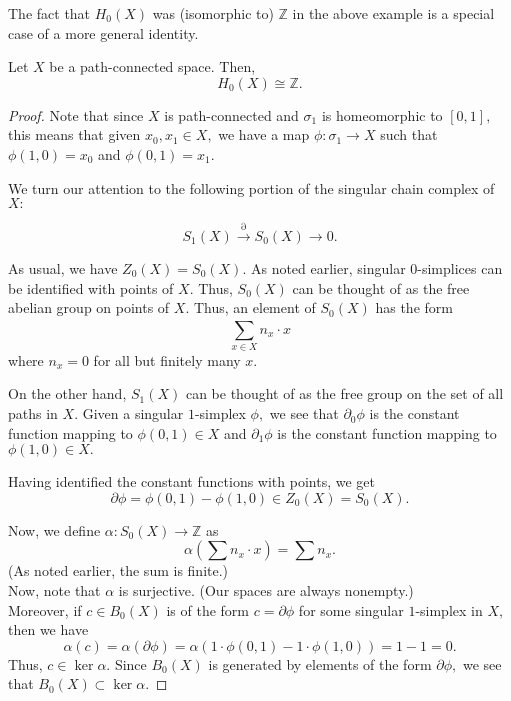 \documentclass[12pt]{article}
\begin{document}
The fact that $H_0(X)$ was (isomorphic to) $\mathbb{Z}$ in the above example is a special case of a more general identity.

\begin{prop} \label{prop:pathconnectedh0isZ}
	Let $X$ be a path-connected space. Then,
	\begin{equation*} 
		H_0(X) \cong \mathbb{Z}.
	\end{equation*}
\end{prop}
\begin{proof} 
	Note that since $X$ is path-connected and $\sigma_1$ is homeomorphic to $[0, 1],$ this means that given $x_0, x_1 \in X,$ we have a map $\phi:\sigma_1\to X$ such that $\phi(1, 0) = x_0$ and $\phi(0, 1) = x_1.$

	We turn our attention to the following portion of the singular chain complex of $X:$

	\begin{equation*} 
		S_1(X) \overset{\partial}{\longrightarrow} S_0(X) \overset{}{\longrightarrow} 0.
	\end{equation*}

	As usual, we have $Z_0(X) = S_0(X).$ As noted earlier, singular $0$-simplices can be identified with points of $X.$ Thus, $S_0(X)$ can be thought of as the free abelian group on points of $X.$ Thus, an element of $S_0(X)$ has the form
	\begin{equation*} 
		\sum_{x \in X}^{}n_x\cdot x
	\end{equation*}
	where $n_x = 0$ for all but finitely many $x.$

	On the other hand, $S_1(X)$ can be thought of as the free group on the set of all paths in $X.$ Given a singular $1$-simplex $\phi,$ we see that $\partial_0\phi$ is the constant function mapping to $\phi(0, 1) \in X$ and $\partial_1\phi$ is the constant function mapping to $\phi(1, 0) \in X.$

	Having identified the constant functions with points, we get
	\begin{equation*} 
		\partial\phi = \phi(0, 1) - \phi(1, 0) \in Z_0(X) = S_0(X).
	\end{equation*}

	Now, we define $\alpha:S_0(X) \to \mathbb{Z}$ as
	\begin{equation*} 
		\alpha\left(\sum n_x\cdot x\right) = \sum n_x.
	\end{equation*}
	(As noted earlier, the sum is finite.)\\
	Now, note that $\alpha$ is surjective. (Our spaces are always nonempty.)\\
	Moreover, if $c \in B_0(X)$ is of the form $c = \partial\phi$ for some singular $1$-simplex in $X,$ then we have
	\begin{equation*} 
		\alpha(c) = \alpha(\partial\phi) = \alpha(1\cdot\phi(0, 1) - 1\cdot\phi(1, 0)) = 1 - 1 = 0.
	\end{equation*}
	Thus, $c \in \ker\alpha.$ Since $B_0(X)$ is generated by elements of the form $\partial\phi,$ we see that $B_0(X) \subset \ker\alpha.$


\end{proof}
\end{document}
